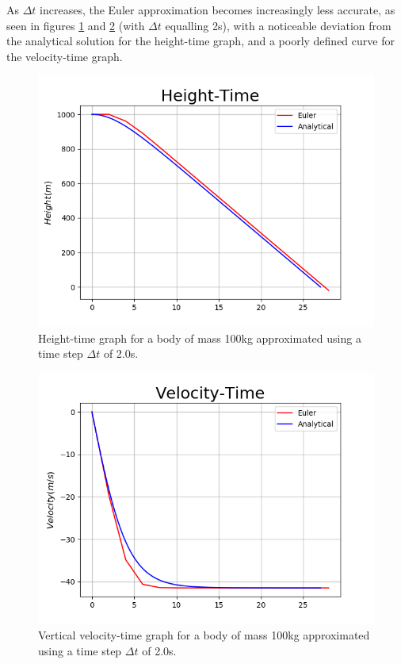 \documentclass[twocolumn,prl,nobalancelastpage,aps,10pt]{revtex4-1}
\begin{document}
As $\Delta t$ increases, the Euler approximation becomes increasingly less accurate, as seen in figures \ref{ana-fig-ht-t=2.0} and \ref{ana-fig-vt-t=2.0} (with $\Delta t$ equalling 2s), with a noticeable deviation from the analytical solution for the height-time graph, and a poorly defined curve for the velocity-time graph.
\begin{figure}
	\includegraphics*[width=0.96\linewidth,clip]{ana-fig-ht-t=20}
	\caption{Height-time graph for a body of mass 100kg approximated using a time step $\Delta t$ of  2.0s.}\label{ana-fig-ht-t=2.0}
\end{figure}
\begin{figure}
	\includegraphics*[width=0.96\linewidth,clip]{ana-fig-vt-t=20}
	\caption{Vertical velocity-time graph for a body of mass 100kg approximated using a time step $\Delta t$ of  2.0s.}\label{ana-fig-vt-t=2.0}
\end{figure}
\end{document}
